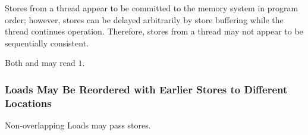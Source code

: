 Stores from a thread appear to be committed to the memory system in program order; however, stores can be delayed arbitrarily by store buffering while the thread continues operation.
Therefore, stores from a thread may not appear to be sequentially consistent.

\begin{table}[!hbt]
\noindent{}
\caption[Stores Can Be Arbitrarily Delayed]{Stores Can Be Arbitrarily Delayed \cite[Example 3]{ref:AMD}}
\label{tbl:litmus:amd:3}
\end{table}

\noindent
Both  and  may read $1$.

\subsubsection*{Loads May Be Reordered with Earlier Stores to Different Locations}

Non-overlapping Loads may pass stores.

